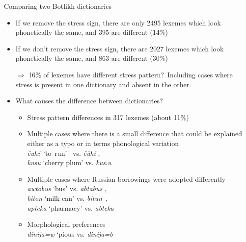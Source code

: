 \documentclass[13pt, t]{beamer}
\begin{document}
\begin{frame}{Comparing two Botlikh dictionaries}
\begin{itemize}
\item If we remove the stress sign, there are only 2495 lexemes which look phonetically the same, and 395 are different (14\%)
\item If we don't remove the stress sign, there are 2027 lexemes which look phonetically  the same, and 863 are different (30\%)
\item[\color{colorblue} $\Rightarrow$] 16\% of lexemes have different stress pattern?\pause\ Including cases where stress is present in one dictionary and absent in the other. \pause 
\item What causes the difference between dictionaries?
\begin{itemize}
\item Stress pattern differences in 317 lexemes (about 11\%)
\item Multiple cases where there is a small difference that could be explained either as a typo or in terms phonological variation \\ 
\hspace{-5em}\textit{čuhí}~`to~run’~\citep{alekseev2019}  vs. \textit{čũhí} \citep{saidovaabusov2012}, \\
\hspace{-5em}\textit{kusu} `cherry plum’ \citep{alekseev2019}  vs. \textit{kusːu} \citep{saidovaabusov2012}
\item Multiple cases where Russian borrowings were adopted differently \\ 
\hspace{-5em}\textit{awtobus} `bus’ \citep{alekseev2019} vs. \textit{abtabus} \citep{saidovaabusov2012}, \\
\hspace{-5em}\textit{biton} `milk can’ \citep{alekseev2019}  vs. \textit{bitun}~\citep{saidovaabusov2012}, \\
\hspace{-5em}\textit{apteka} `pharmacy’ \citep{alekseev2019} vs. \textit{abteka}~\citep{saidovaabusov2012}
\item Morphological preferences \\
\hspace{-5em}\textit{dinija=w} `pious \citep{alekseev2019} vs. \textit{dinija=b}~\citep{saidovaabusov2012} 
\end{itemize}
\end{itemize}
\end{frame}
\end{document}
